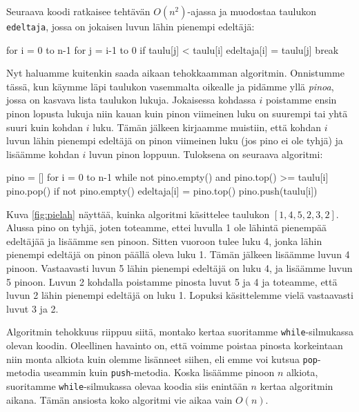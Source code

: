 Seuraava koodi ratkaisee tehtävän $O(n^2)$-ajassa ja muodostaa
taulukon \texttt{edeltaja}, jossa on jokaisen luvun lähin pienempi edeltäjä:

\begin{code}
for i = 0 to n-1
    for j = i-1 to 0
        if taulu[j] < taulu[i]
            edeltaja[i] = taulu[j]
            break
\end{code}

Nyt haluamme kuitenkin saada aikaan tehokkaamman algoritmin.
Onnistumme tässä, kun käymme läpi taulukon
vasemmalta oikealle ja pidämme yllä \emph{pinoa}, jossa on
kasvava lista taulukon lukuja.
Jokaisessa kohdassa $i$ poistamme ensin pinon lopusta lukuja
niin kauan kuin pinon viimeinen luku on suurempi tai yhtä
suuri kuin kohdan $i$ luku.
Tämän jälkeen kirjaamme muistiin, että kohdan $i$ luvun
lähin pienempi edeltäjä on pinon viimeinen luku (jos pino ei ole tyhjä) ja
lisäämme kohdan $i$ luvun pinon loppuun.
Tuloksena on seuraava algoritmi:

\begin{code}
pino = []
for i = 0 to n-1
    while not pino.empty() and pino.top() >= taulu[i]
        pino.pop()
    if not pino.empty()
        edeltaja[i] = pino.top()
    pino.push(taulu[i])
\end{code}

Kuva \ref{fig:pielah} näyttää, kuinka algoritmi käsittelee taulukon $[1,4,5,2,3,2]$.
Alussa pino on tyhjä, joten toteamme, ettei luvulla 1
ole lähintä pienempää edeltäjää ja lisäämme sen pinoon.
Sitten vuoroon tulee luku 4, jonka lähin pienempi edeltäjä
on pinon päällä oleva luku 1. Tämän jälkeen lisäämme luvun 4 pinoon.
Vastaavasti luvun 5 lähin pienempi edeltäjä on luku 4,
ja lisäämme luvun 5 pinoon.
Luvun 2 kohdalla poistamme pinosta luvut 5 ja 4
ja toteamme, että luvun 2 lähin pienempi edeltäjä on luku 1.
Lopuksi käsittelemme vielä vastaavasti luvut 3 ja 2.

Algoritmin tehokkuus riippuu siitä, montako kertaa suoritamme
\texttt{while}-silmukassa olevan koodin.
Oleellinen havainto on, että voimme poistaa pinosta
korkeintaan niin monta alkiota kuin olemme lisänneet siihen,
eli emme voi kutsua \texttt{pop}-metodia useammin kuin \texttt{push}-metodia.
Koska lisäämme pinoon $n$ alkiota, suoritamme \texttt{while}-silmukassa
olevaa koodia siis enintään $n$ kertaa algoritmin aikana.
Tämän ansiosta koko algoritmi vie aikaa vain $O(n)$.